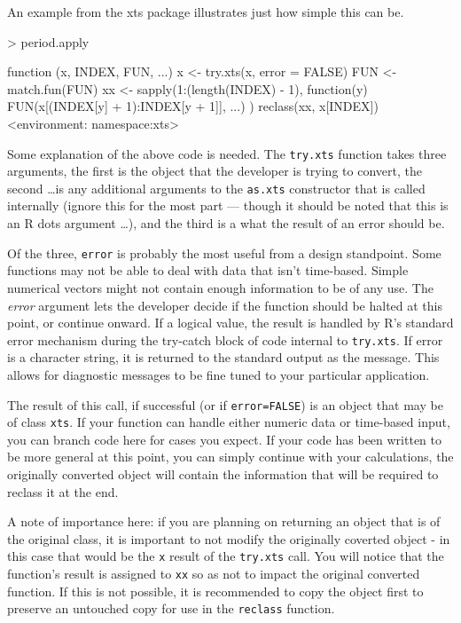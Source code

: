 \documentclass{article}
\begin{document}
An example from the xts package illustrates just how simple
this can be.

\begin{Schunk}
\begin{Sinput}
> period.apply
\end{Sinput}
\begin{Soutput}
function (x, INDEX, FUN, ...) 
{
    x <- try.xts(x, error = FALSE)
    FUN <- match.fun(FUN)
    xx <- sapply(1:(length(INDEX) - 1), function(y) {
        FUN(x[(INDEX[y] + 1):INDEX[y + 1]], ...)
    })
    reclass(xx, x[INDEX])
}
<environment: namespace:xts>
\end{Soutput}
\end{Schunk}

Some explanation of the above code is needed. The
{\tt try.xts} function takes three arguments, the first
is the object that the developer is trying to
convert, the second \ldots is any additional arguments to
the {\tt as.xts} constructor that is called internally
(ignore this for the most part --- though it should
be noted that this is an R dots argument \ldots), and the third is
a what the result of an error should be.

Of the three, {\tt error} is probably the most useful
from a design standpoint.  Some functions may not
be able to deal with data that isn't time-based. Simple
numerical vectors might not contain enough information
to be of any use. The \emph{error} argument
lets the developer decide if the function should be
halted at this point, or continue onward.
If a logical value, the result is
handled by R's standard error mechanism during the try-catch
block of code internal to {\tt try.xts}. If error is
a character string, it is returned to the standard output
as the message.  This allows for diagnostic messages to
be fine tuned to your particular application.

The result of this call, if successful (or if {\tt error=FALSE})
is an object that may be of class {\tt xts}.  If
your function can handle either numeric data or time-based
input, you can branch code here for cases you expect.  If your
code has been written to be more general
at this point, you can simply continue with your calculations,
the originally converted object will contain
the information that will be required to reclass it at the end.

A note of importance here: if you are planning on
returning an object that is of the original class, it
is important to not modify the originally coverted object - in this
case that would be the {\tt x} result of the {\tt try.xts} call.
You will notice that the function's result is assigned to
{\tt xx} so as not to impact the original converted function. If
this is not possible, it is recommended to copy the object first
to preserve an untouched copy for use in the {\tt reclass} function.
\end{document}
